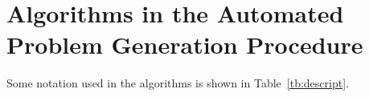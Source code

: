 \section{Algorithms in the Automated Problem Generation Procedure\label{sec:app3:algorithms}}

Some notation used in the algorithms is shown in Table~\ref{tb:descript}.



















